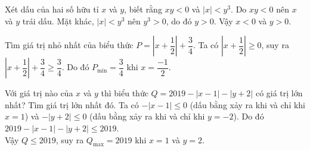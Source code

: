 \begin{vd}
 Xét dấu của hai số hữu tỉ $x$ và $y$, biết rằng $xy<0$ và $\left|x\right|<y^3$.
\loigiai
{
Do $xy<0$ nên $x$ và $y$ trái dấu. Mặt khác, $\left|x\right|<y^3$ nên $y^3>0$, do đó $y>0$. Vậy $x<0$ và $y>0$.
}
\end{vd}
\begin{vd}
Tìm giá trị nhỏ nhất của biểu thức $P=\left|x+\dfrac{1}{2}\right|+\dfrac{3}{4}$.
\loigiai
{
Ta có $\left|x+\dfrac{1}{2}\right|\ge 0$, suy ra $\left|x+\dfrac{1}{2}\right|+\dfrac{3}{4}\ge \dfrac{3}{4}$. Do đó $P_{\min}=\dfrac{3}{4}$ khi $x=\dfrac{-1}{2}$.
}
\end{vd}
\begin{vd}
Với giá trị nào của $x$ và $y$ thì biểu thức $Q=2019-\left|x-1\right|-\left|y+2\right|$ có giá trị lớn nhất? Tìm giá trị lớn nhất đó.
\loigiai
{
Ta có $-\left|x-1\right|\le 0$ (dấu bằng xảy ra khi và chỉ khi $x=1$) và $-\left|y+2\right|\le 0$ (dấu bằng xảy ra khi và chỉ khi $y=-2$). Do đó $2019-\left|x-1\right|-\left|y+2\right|\le 2019$.\\
Vậy $Q\le 2019$, suy ra $Q_{\max}=2019$ khi $x=1$ và $y=2$.
}
\end{vd}

